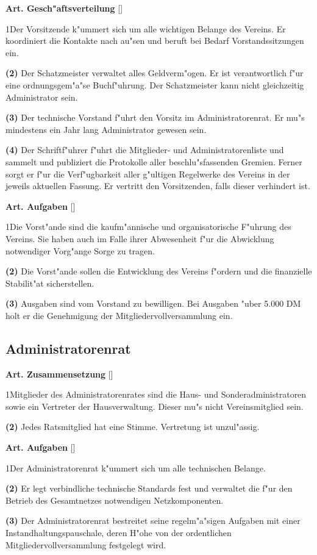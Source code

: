 \documentclass[12pt]{article}
\newcommand{\UAbschnitt}[1]{\subsection{#1}}
\newcommand{\Satz}[2]{

\begin{samepage}
{\bf (#1)} #2
\end{samepage}
}
\newenvironment{Artikel}[2]{
\bigskip \centerline{{\bf Art. #1} [#2]}
\nopagebreak
}{
}
\begin{document}
\begin{Artikel}{23}{Gesch"aftsverteilung}

\Satz{1}{Der Vorsitzende k"ummert sich um alle wichtigen Belange des 
Vereins. Er koordiniert die Kontakte nach au"sen und beruft bei
Bedarf Vorstandssitzungen ein.}

\Satz{2}{Der Schatzmeister verwaltet alles Geldverm"ogen. Er ist 
verantwortlich f"ur eine ordnungsgem"a"se Buchf"uhrung. Der Schatzmeister
kann nicht gleichzeitig Administrator sein.}

\Satz{3}{Der technische Vorstand f"uhrt den Vorsitz im Administratorenrat.
Er mu"s mindestens ein Jahr lang Administrator gewesen sein.}

\Satz{4}{Der Schriftf"uhrer f"uhrt die Mitglieder- und 
Administratorenliste und sammelt und publiziert die Protokolle aller 
beschlu"sfassenden Gremien. Ferner sorgt er f"ur die Verf"ugbarkeit
aller g"ultigen Regelwerke des Vereins in der jeweils aktuellen Fassung. 
Er vertritt den Vorsitzenden, falls dieser verhindert ist.}

\end{Artikel}

\begin{Artikel}{24}{Aufgaben}

\Satz{1}{Die Vorst"ande sind die kaufm"annische und organisatorische 
F"uhrung des Vereins. Sie haben auch im Falle ihrer Abwesenheit f"ur die 
Abwicklung notwendiger Vorg"ange Sorge zu tragen.}

\Satz{2}{Die Vorst"ande sollen die Entwicklung des Vereins f"ordern und die
finanzielle Stabilit"at sicherstellen.}

\Satz{3}{Ausgaben sind vom Vorstand zu bewilligen.
Bei Ausgaben "uber 5.000 DM holt er die Genehmigung der 
Mitgliedervollversammlung ein.}

\end{Artikel}

\UAbschnitt{Administratorenrat}

\begin{Artikel}{25}{Zusammensetzung}

\Satz{1}{Mitglieder des Administratorenrates sind die Haus- und 
Sonderadministratoren sowie ein Vertreter der Hausverwaltung. 
Dieser mu"s nicht Vereinsmitglied sein.}

\Satz{2}{Jedes Ratsmitglied hat eine Stimme. Vertretung ist unzul"assig.}

\end{Artikel}

\begin{Artikel}{26}{Aufgaben}

\Satz{1}{Der Administratorenrat k"ummert sich um alle technischen Belange.}

\Satz{2}{Er legt verbindliche technische Standards fest und verwaltet
die f"ur den Betrieb des Gesamtnetzes notwendigen Netzkomponenten.}

\Satz{3}{Der Administratorenrat bestreitet seine regelm"a"sigen Aufgaben
mit einer Instandhaltungspauschale, deren H"ohe von der ordentlichen 
Mitgliedervollversammlung festgelegt wird.}

\end{Artikel}
\end{document}
